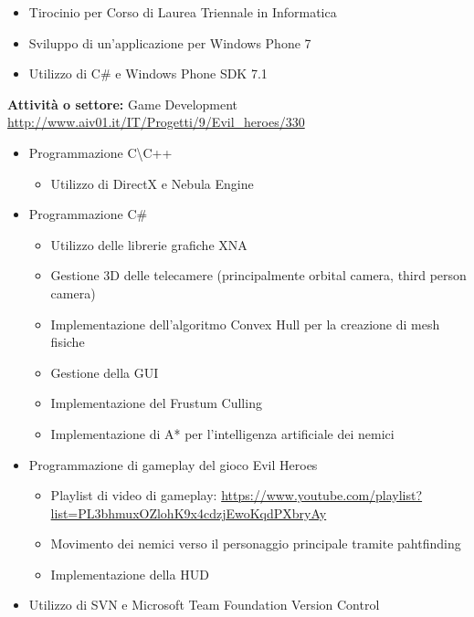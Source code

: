 \documentclass[11pt,a4paper,sans]{moderncv} %
\begin{document}
{
	\begin{itemize}
		\item Tirocinio per Corso di Laurea Triennale in Informatica
		\item Sviluppo di un'applicazione per Windows Phone 7
		\item Utilizzo di C\# e Windows Phone SDK 7.1
	\end{itemize}
}

{
	\textbf{Attivit\`{a} o settore:} Game Development
	\newline{}
	\url{http://www.aiv01.it/IT/Progetti/9/Evil_heroes/330} 
	\begin{itemize}
		\item Programmazione C\textbackslash C++
		\begin{itemize}
			\item Utilizzo di DirectX e Nebula Engine
		\end{itemize}
		\item Programmazione C\#
		\begin{itemize}
			\item Utilizzo delle librerie grafiche XNA
			\item Gestione 3D delle telecamere (principalmente orbital camera, third person camera)
			\item Implementazione dell'algoritmo Convex Hull per la creazione di mesh fisiche
			\item Gestione della GUI
			\item Implementazione del Frustum Culling
			\item Implementazione di A* per l'intelligenza artificiale dei nemici
		\end{itemize}
		\item Programmazione di gameplay del gioco Evil Heroes
		\begin{itemize}
			\item Playlist di video di gameplay:
			\newline{}
			\url{https://www.youtube.com/playlist?list=PL3bhmuxOZlohK9x4cdzjEwoKqdPXbryAy}
			\item Movimento dei nemici verso il personaggio principale tramite pahtfinding
			\item Implementazione della HUD
		\end{itemize}
		\item Utilizzo di SVN e Microsoft Team Foundation Version Control
	\end{itemize}
}
\end{document}
